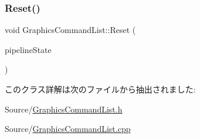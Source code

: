 \subsubsection{\texorpdfstring{Reset()}{Reset()}\hspace{0.1cm}{\footnotesize\ttfamily [2/2]}}
{\footnotesize\ttfamily void Graphics\+Command\+List\+::\+Reset (\begin{DoxyParamCaption}\item[{Com\+Ptr$<$ I\+D3\+D12\+Pipeline\+State $>$}]{pipeline\+State }\end{DoxyParamCaption})}



このクラス詳解は次のファイルから抽出されました\+:\begin{DoxyCompactItemize}
\item 
Source/\mbox{\hyperlink{_graphics_command_list_8h}{Graphics\+Command\+List.\+h}}\item 
Source/\mbox{\hyperlink{_graphics_command_list_8cpp}{Graphics\+Command\+List.\+cpp}}\end{DoxyCompactItemize}
